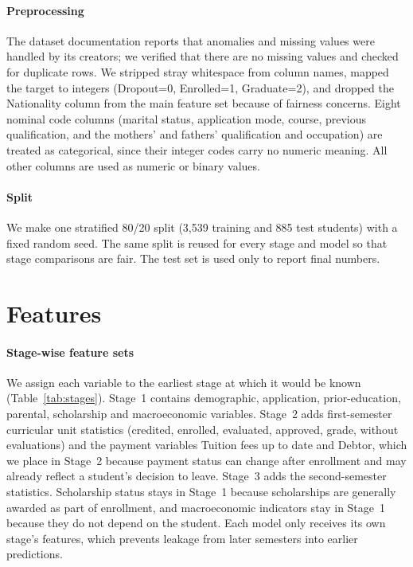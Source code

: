 \documentclass[11pt]{article}
\begin{document}
\paragraph{Preprocessing} The dataset documentation reports that anomalies and missing values were handled by its creators; we verified that there are no missing values and checked for duplicate rows. We stripped stray whitespace from column names, mapped the target to integers (Dropout=0, Enrolled=1, Graduate=2), and dropped the Nationality column from the main feature set because of fairness concerns. Eight nominal code columns (marital status, application mode, course, previous qualification, and the mothers' and fathers' qualification and occupation) are treated as categorical, since their integer codes carry no numeric meaning. All other columns are used as numeric or binary values.

\paragraph{Split} We make one stratified 80/20 split (3,539 training and 885 test students) with a fixed random seed. The same split is reused for every stage and model so that stage comparisons are fair. The test set is used only to report final numbers.

\section{Features}
\paragraph{Stage-wise feature sets} We assign each variable to the earliest stage at which it would be known (Table~\ref{tab:stages}). Stage~1 contains demographic, application, prior-education, parental, scholarship and macroeconomic variables. Stage~2 adds first-semester curricular unit statistics (credited, enrolled, evaluated, approved, grade, without evaluations) and the payment variables Tuition fees up to date and Debtor, which we place in Stage~2 because payment status can change after enrollment and may already reflect a student's decision to leave. Stage~3 adds the second-semester statistics. Scholarship status stays in Stage~1 because scholarships are generally awarded as part of enrollment, and macroeconomic indicators stay in Stage~1 because they do not depend on the student. Each model only receives its own stage's features, which prevents leakage from later semesters into earlier predictions.
\end{document}
